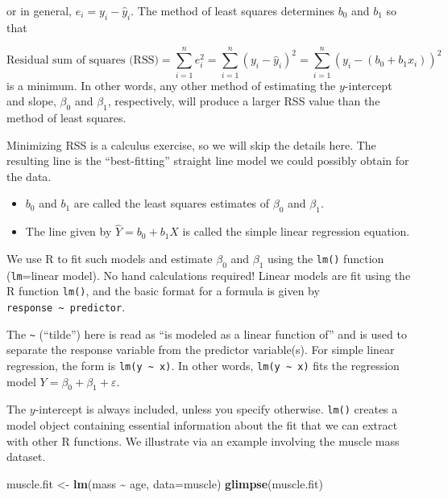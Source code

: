 \documentclass[
]{book}
\newenvironment{Shaded}{\begin{snugshade}}{\end{snugshade}}
\newcommand{\AttributeTok}[1]{\textcolor[rgb]{0.13,0.29,0.53}{#1}}
\newcommand{\FunctionTok}[1]{\textcolor[rgb]{0.13,0.29,0.53}{\textbf{#1}}}
\newcommand{\NormalTok}[1]{#1}
\newcommand{\OtherTok}[1]{\textcolor[rgb]{0.56,0.35,0.01}{#1}}
\newcommand{\SpecialCharTok}[1]{\textcolor[rgb]{0.81,0.36,0.00}{\textbf{#1}}}
\providecommand{\tightlist}{%
  \setlength{\itemsep}{0pt}\setlength{\parskip}{0pt}}
\begin{document}
or in general, \(e_i = y_i - \hat{y}_i\).
The method of least squares determines \(b_0\) and \(b_1\) so that

\[\textrm{Residual sum of squares (RSS)} = \sum_{i=1}^n e_i^2 = \sum_{i=1}^n\left(y_i - \hat{y}_i\right)^2 = \sum_{i=1}^n\left(y_i - \left(b_0 + b_1 x_i\right)\right)^2\]
is a minimum.
In other words, any other method of estimating the \(y\)-intercept and slope, \(\beta_0\) and \(\beta_1\), respectively, will produce a larger RSS value than the method of least squares.

Minimizing RSS is a calculus exercise, so we will skip the details here.
The resulting line is the ``best-fitting'' straight line model we could possibly obtain for the data.

\begin{itemize}
\tightlist
\item
  \(b_0\) and \(b_1\) are called the least squares estimates of \(\beta_0\) and \(\beta_1\).
\item
  The line given by \(\hat{Y} = b_0 + b_1 X\) is called the simple linear regression equation.
\end{itemize}

We use R to fit such models and estimate \(\beta_0\) and \(\beta_1\) using the \texttt{lm()} function (\texttt{lm}=linear model).
No hand calculations required!
Linear models are fit using the R function \texttt{lm()}, and the basic format for a formula is given by \texttt{response\ \textasciitilde{}\ predictor}.

The \texttt{\textasciitilde{}} (``tilde'') here is read as ``is modeled as a linear function of'' and is used to separate the response variable from the predictor variable(s).
For simple linear regression, the form is \texttt{lm(y\ \textasciitilde{}\ x)}.
In other words, \texttt{lm(y\ \textasciitilde{}\ x)} fits the regression model \(Y = \beta_0 + \beta_1 + \varepsilon\).

The \(y\)-intercept is always included, unless you specify otherwise.
\texttt{lm()} creates a model object containing essential information about the fit that we can extract with other R functions.
We illustrate via an example involving the muscle mass dataset.

\begin{Shaded}
\begin{Highlighting}[]
\NormalTok{muscle.fit }\OtherTok{\textless{}{-}} \FunctionTok{lm}\NormalTok{(mass }\SpecialCharTok{\textasciitilde{}}\NormalTok{ age, }\AttributeTok{data=}\NormalTok{muscle)}
\FunctionTok{glimpse}\NormalTok{(muscle.fit)}
\end{Highlighting}
\end{Shaded}
\end{document}
